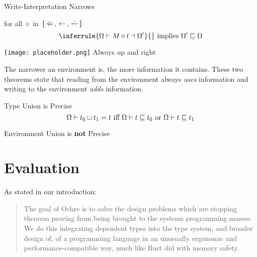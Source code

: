 \documentclass[12pt,twoside]{report}
\begin{document}
\begin{Property}{Write-Interpretation Narrows}{} %
  \begin{minipage}{0.6\textwidth}
    \centering
    for all $\diamond$ in $\{ \writearrowabs, \narrowarrowabs, \erasedwritearrow \}$
    \[
      \inferrule{
        \Omega \vdash M \diamond t \dashv \Omega'
      }{}
      \text{   implies   }
      \Omega' \subtype \Omega
    \]
  \end{minipage}
  \begin{minipage}{0.3\textwidth}
    \centering
    \texttt{[image: placeholder.png]}
    Always up and right
  \end{minipage}
\end{Property}
\label{theorem:expressionwritewidens}

The narrower an environment is, the more information it contains. These two theorems state that reading from the environment always \textit{uses} information and writing to the environment \textit{adds} information.

\begin{Property}{Type Union is Precise}{}
  \[
    \Omega \vdash t_0 \sqcup t_1 = t
    \text{   iff   }
    \Omega \vdash t \sqsubseteq t_0
    \text{   or   } 
    \Omega \vdash t \sqsubseteq t_1
  \]
\end{Property}
\label{theorem:precisetypeunion}

\begin{Property}{Environment Union is \textbf{not} Precise}{}
\end{Property}
\label{theorem:inpreciseenvunion}


\chapter{Evaluation}
As stated in our introduction:

\begin{quote}
  The goal of Ochre is to solve the design problems which are stopping theorem proving from being brought to the systems programming masses. We do this integrating dependent types into the type system, and broader design of, of a programming language in an unusually ergonomic and performance-compatible way, much like Rust did with memory safety.
\end{quote}
\end{document}
